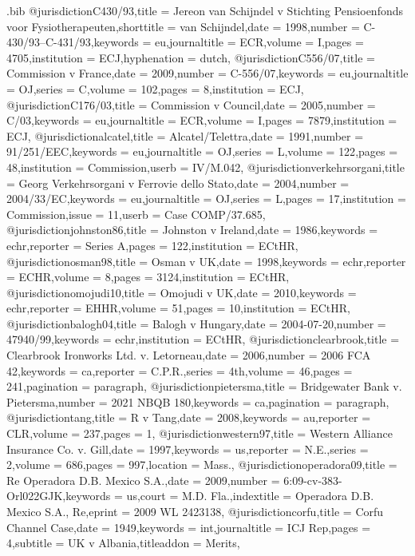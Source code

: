 \begin{filecontents*}{\jobname.bib}
@jurisdiction{C430/93,title = {Jereon van Schijndel v Stichting Pensioenfonds voor Fysiotherapeuten},shorttitle = {van Schijndel},date = {1998},number = {C-430/93--C-431/93},keywords = {eu},journaltitle = {ECR},volume = {I},pages = {4705},institution = {ECJ},hyphenation = {dutch},}
@jurisdiction{C556/07,title = {Commission v France},date = {2009},number = {C-556/07},keywords = {eu},journaltitle = {OJ},series = {C},volume = {102},pages = {8},institution = {ECJ},}
@jurisdiction{C176/03,title = {Commission v Council},date = {2005},number = {C/03},keywords = {eu},journaltitle = {ECR},volume = {I},pages = {7879},institution = {ECJ},}
@jurisdiction{alcatel,title = {Alcatel/Telettra},date = {1991},number = {91\slash 251\slash EEC},keywords = {eu},journaltitle = {OJ},series = {L},volume = {122},pages = {48},institution = {Commission},userb = {IV/M.042},}
@jurisdiction{verkehrsorgani,title = {Georg Verkehrsorgani v Ferrovie dello Stato},date = {2004},number = {2004\slash 33\slash EC},keywords = {eu},journaltitle = {OJ},series = {L},pages = {17},institution = {Commission},issue = {11},userb = {Case COMP\slash 37.685},}
@jurisdiction{johnston86,title = {Johnston v Ireland},date = {1986},keywords = {echr},reporter = {Series A},pages = {122},institution = {ECtHR},}
@jurisdiction{osman98,title = {Osman v UK},date = {1998},keywords = {echr},reporter = {ECHR},volume = {8},pages = {3124},institution = {ECtHR},}
@jurisdiction{omojudi10,title = {Omojudi v UK},date = {2010},keywords = {echr},reporter = {EHHR},volume = {51},pages = {10},institution = {ECtHR},}
@jurisdiction{balogh04,title = {Balogh v Hungary},date = { 2004-07-20},number = {47940/99},keywords = {echr},institution = {ECtHR},}
@jurisdiction{clearbrook,title = {Clearbrook Ironworks Ltd. v. Letorneau},date = {2006},number = {2006 FCA 42},keywords = {ca},reporter = {C.P.R.},series = {4th},volume = {46},pages = {241},pagination = {paragraph},}
@jurisdiction{pietersma,title = {Bridgewater Bank v. Pietersma},number = {2021 NBQB 180},keywords = {ca},pagination = {paragraph},}
@jurisdiction{tang,title = {R v Tang},date = {2008},keywords = {au},reporter = {CLR},volume = {237},pages = {1},}
@jurisdiction{western97,title = {Western Alliance Insurance Co. v. Gill},date = {1997},keywords = {us},reporter = {N.E.},series = {2},volume = {686},pages = {997},location = {Mass.\@},}
@jurisdiction{operadora09,title = {Re Operadora D.B. Mexico S.A.},date = {2009},number = {6:09-cv-383-Orl022GJK},keywords = {us},court = {M.D. Fla.},indextitle = {Operadora D.B. Mexico S.A., Re},eprint = {2009 WL 2423138},}
@jurisdiction{corfu,title = {Corfu Channel Case},date = {1949},keywords = {int},journaltitle = {ICJ Rep},pages = {4},subtitle = {UK v Albania},titleaddon = {Merits},}

\end{filecontents*}

